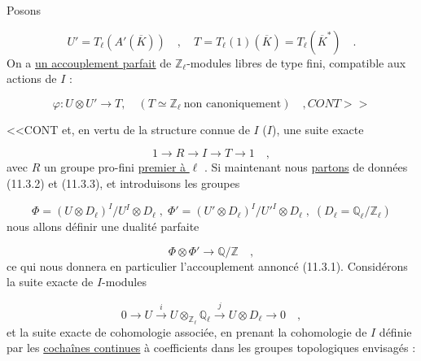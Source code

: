 Posons

\begin{equation*}
U' = T_\ell(A'(\overline{K})) \quad , \quad T = T_\ell(1)(\overline{K}) = T_\ell(\overline{K}^*) \quad .
\end{equation*}
On a \underline{un accouplement parfait} de $\mathbb{Z}_\ell$-modules libres de type fini, compatible aux actions de $I$ :

\begin{equation}\tag{11.3.2}
\varphi : U \otimes U' \longrightarrow T, \quad (T \simeq \mathbb{Z}_\ell \ \text{non canoniquement}) \quad , CONT>>
\end{equation}


<<CONT et, en vertu de la structure connue de $I$ ($I$\hspace{2.5em}), une suite exacte

\begin{equation}\tag{11.3.3}
1 \longrightarrow R \longrightarrow I \longrightarrow T \longrightarrow 1 \quad ,
\end{equation}
avec $R$ un groupe pro-fini \underline{premier à $\ell$} . Si maintenant nous \underline{partons} de données (11.3.2) et (11.3.3), et introduisons les groupes

\begin{equation}\tag{11,3.4}
\Phi = (U\otimes D_\ell)^I/U^I\otimes D_\ell \;,\; \Phi' = (U'\otimes D_\ell)^I/{U'}^{I}\otimes D_\ell \;,\; (D_\ell = \mathbb{Q}_\ell/\mathbb{Z}_\ell)
\end{equation}
nous allons définir une dualité parfaite

\begin{equation}\tag{11.3.5}
\Phi \otimes \Phi' \longrightarrow \mathbb{Q}/\mathbb{Z} \quad ,
\end{equation}
ce qui nous donnera en particulier l'accouplement annoncé (11.3.1). Considérons la suite exacte de $I$-modules

\begin{equation}\tag{11.3.6}
0 \longrightarrow U \xrightarrow{\ i\ } U\otimes_{\mathbb{Z}_\ell}\mathbb{Q}_\ell \xrightarrow{\ j\ } U\otimes D_\ell \longrightarrow 0 \quad ,
\end{equation}
et la suite exacte de cohomologie associée, en prenant la cohomologie de $I$ définie par les \underline{cochaînes continues} à coefficients dans les groupes topologiques envisagés :

